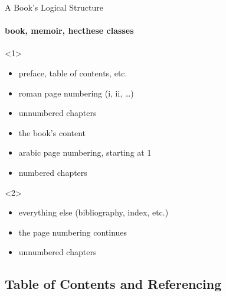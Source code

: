 \begin{frame}[fragile]{A Book's Logical Structure}
	\framesubtitle{book, memoir, hecthese classes}

\begin{onlyenv}<1>
\begin{codesource}
	\frontmatter
\end{codesource}	
	\begin{itemize}
		\item preface, table of contents, etc.
		\item roman page numbering (i, ii, \ldots)
		\item unnumbered chapters 
	\end{itemize}
\begin{codesource}
	\mainmatter
\end{codesource}	
	\begin{itemize}
		\item the book's content
		\item arabic page numbering, starting at 1
		\item numbered chapters
	\end{itemize}
\end{onlyenv}

\begin{onlyenv}<2>
\begin{codesource}
	\backmatter
\end{codesource}
	\begin{itemize}
		\item everything else (bibliography, index, etc.)
		\item the page numbering continues
		\item unnumbered chapters
	\end{itemize}
\end{onlyenv}
\end{frame}

\subsection{Table of Contents and Referencing}

